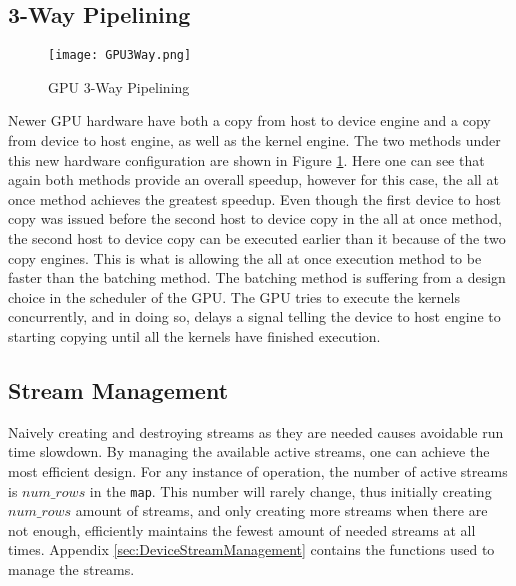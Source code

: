 \subsection{3-Way Pipelining}
\begin{figure}[t!]
\centering
\texttt{[image: GPU3Way.png]}
\caption{GPU 3-Way Pipelining}
\label{fig:GPU3Way}
\end{figure}
Newer GPU hardware have both a copy from host to device engine and a copy from device to host engine, as well as the kernel engine. The two methods under this new hardware configuration are shown in Figure \ref{fig:GPU3Way}. Here one can see that again both methods provide an overall speedup, however for this case, the all at once method achieves the greatest speedup. Even though the first device to host copy was issued before the second host to device copy in the all at once method, the second host to device copy can be executed earlier than it because of the two copy engines. This is what is allowing the all at once execution method to be faster than the batching method. The batching method is suffering from a design choice in the scheduler of the GPU. The GPU tries to execute the kernels concurrently, and in doing so, delays a signal telling the device to host engine to starting copying until all the kernels have finished execution.

\subsection{Stream Management}
Naively creating and destroying streams as they are needed causes avoidable run time slowdown. By managing the available active streams, one can achieve the most efficient design. For any instance of operation, the number of active streams is $num\_rows$ in the \verb|map|. This number will rarely change, thus initially creating $num\_rows$ amount of streams, and only creating more streams when there are not enough, efficiently maintains the fewest amount of needed streams at all times. Appendix \ref{sec:DeviceStreamManagement} contains the functions used to manage the streams.
